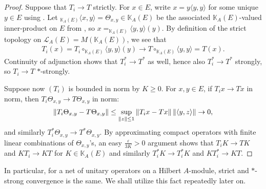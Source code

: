 \begin{proof}
	Suppose that $T_i \to T$ strictly. For $x \in E$, write $x = y\langle y,y\rangle$ for some unique $y \in E$ using . Let $_{\mathbb{K}_A(E)}\langle x,y \rangle = \Theta_{x,y} \in \mathbb{K}_A(E)$ be the associated $\mathbb{K}_A(E)$-valued inner-product on $E$ from , so $x = _{\mathbb{K}_A(E)} \langle y, y \rangle (y)$. By definition of the strict topology on $\mathcal{L}_A(E) = M(\mathbb{K}_A(E))$, we see that 
	\begin{align*}
		T_i(x) = T_i \circ _{\mathbb{K}_A(E)}\langle y,y\rangle (y) \to T \circ _{\mathbb{K}_A(E)} \langle y,y \rangle = T(x).
	\end{align*}
	Continuity of adjunction shows that $T_i^* \to T^*$ as well, hence also $T_i^* \to T^*$ strongly, so $T_i \to T$ $*$-strongly.

	Suppose now $(T_i)$ is bounded in norm by $K \geq 0$. For $x, y \in E$, if $T_i x \to Tx$ in norm, then $T_i \Theta_{x,y} \to T \Theta_{x,y}$ in norm:
	\begin{align*}
		\left\lVert T_i \Theta_{x,y} - T \Theta_{x,y}\right\rVert  \leq \sup_{\left\lVert z \right\rVert \leq 1} \left\lVert T_i x - T x \right\rVert \left\lVert \langle y,z\rangle \right\rVert \to 0,
	\end{align*}
	and similarly $T_i^* \Theta_{x,y} \to T^* \Theta_{x,y}$. By approximating compact operators with finite linear combinations of $\Theta_{x,y}$'s, an easy $\frac{\varepsilon}{3K}>0$ argument shows that $T_i K \to T K$ and $KT_i \to KT$ for $K \in \mathbb{K}_A(E)$ and similarly $T_i^*K \to T_i^*K$ and $KT_i^* \to K T$.
\end{proof}

In particular, for a net of unitary operators on a Hilbert $A$-module, strict and $*$-strong convergence is the same. We shall utilize this fact repeatedly later on.
